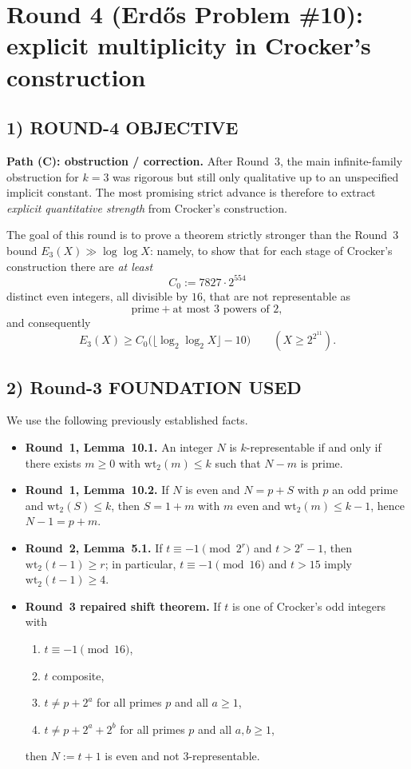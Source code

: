 \section{Round 4 (Erd\H{o}s Problem \#10): explicit multiplicity in Crocker's construction}

\subsection{1) ROUND-4 OBJECTIVE}

\noindent\textbf{Path (C): obstruction / correction.}
After Round~3, the main infinite-family obstruction for $k=3$ was rigorous but still only qualitative up to an unspecified implicit constant. The most promising strict advance is therefore to extract \emph{explicit quantitative strength} from Crocker's construction.

\medskip
\noindent
The goal of this round is to prove a theorem strictly stronger than the Round~3 bound $E_3(X)\gg \log\log X$: namely, to show that for each stage of Crocker's construction there are \emph{at least}
\[
C_0:=7827\cdot 2^{554}
\]
distinct even integers, all divisible by $16$, that are not representable as
\[
\text{prime}+\text{at most }3\text{ powers of }2,
\]
and consequently
\[
E_3(X)\ge C_0\bigl(\lfloor \log_2\log_2 X\rfloor-10\bigr)
\qquad (X\ge 2^{2^{11}}).
\]

\subsection{2) Round-3 FOUNDATION USED}

We use the following previously established facts.

\begin{itemize}
\item \textbf{Round~1, Lemma~10.1.} An integer $N$ is $k$-representable if and only if there exists $m\ge 0$ with $\mathrm{wt}_2(m)\le k$ such that $N-m$ is prime.
\item \textbf{Round~1, Lemma~10.2.} If $N$ is even and $N=p+S$ with $p$ an odd prime and $\mathrm{wt}_2(S)\le k$, then $S=1+m$ with $m$ even and $\mathrm{wt}_2(m)\le k-1$, hence $N-1=p+m$.
\item \textbf{Round~2, Lemma~5.1.} If $t\equiv -1\pmod{2^r}$ and $t>2^r-1$, then $\mathrm{wt}_2(t-1)\ge r$; in particular, $t\equiv -1\pmod{16}$ and $t>15$ imply $\mathrm{wt}_2(t-1)\ge 4$.
\item \textbf{Round~3 repaired shift theorem.} If $t$ is one of Crocker's odd integers with
\begin{enumerate}
\item $t\equiv -1\pmod{16}$,
\item $t$ composite,
\item $t\neq p+2^a$ for all primes $p$ and all $a\ge 1$,
\item $t\neq p+2^a+2^b$ for all primes $p$ and all $a,b\ge 1$,
\end{enumerate}
then $N:=t+1$ is even and not $3$-representable.
\end{itemize}

